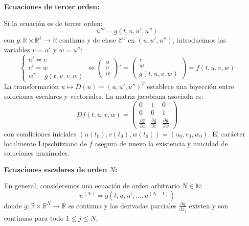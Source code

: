 \medskip

\textbf{Ecuaciones de tercer orden:}

Si la ecuación es de tercer orden:
\[
    u''' = g(t, u, u', u'')
\]
con $g: \mathbb{R} \times \mathbb{R}^3 \to \mathbb{R}$ continua y de clase $\mathcal{C}^1$ en $(u, u', u'')$, introducimos las variables $v = u'$ y $w = u''$:
\[
    \begin{cases}
        u' = v \\
        v' = w \\
        w' = g(t, u, v, w)
    \end{cases}
    \iff
    \begin{pmatrix} u \\ v \\ w \end{pmatrix}' = \begin{pmatrix} v \\ w \\ g(t, u, v, w) \end{pmatrix} = f(t, u, v, w)
\]
La transformación $u \mapsto D(u) = (u, u', u'')^T$ establece una biyección entre soluciones escalares y vectoriales. La matriz jacobiana asociada es:
\[
    Df(t, u, v, w) = \begin{pmatrix}
        0 & 1 & 0 \\
        0 & 0 & 1 \\
        \frac{\partial g}{\partial u} & \frac{\partial g}{\partial v} & \frac{\partial g}{\partial w}
    \end{pmatrix}
\]
con condiciones iniciales $(u(t_0), v(t_0), w(t_0)) = (u_0, v_0, w_0)$. El carácter localmente Lipschitziano de $f$ asegura de nuevo la existencia y unicidad de soluciones maximales.

\medskip

\textbf{Ecuaciones escalares de orden $N$:}

En general, consideremos una ecuación de orden arbitrario $N \in \mathbb{N}$:
\[
    u^{(N)} = g(t, u, u', \dots, u^{(N-1)})
\]
donde $g: \mathbb{R} \times \mathbb{R}^N \to \mathbb{R}$ es continua y las derivadas parciales $\frac{\partial g}{\partial x_j}$ existen y son continuas para todo $1 \leq j \leq N$.

